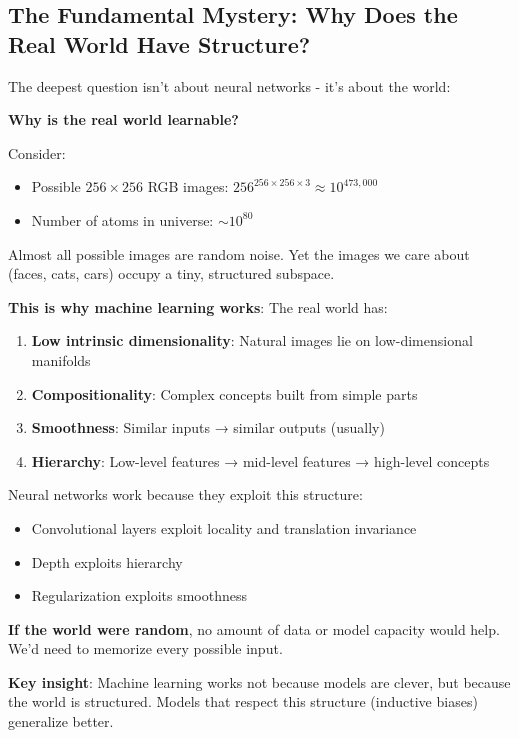 \subsection{The Fundamental Mystery: Why Does the Real World Have Structure?}

The deepest question isn't about neural networks - it's about the world:

\textbf{Why is the real world learnable?}

Consider:
\begin{itemize}
\item Possible $256 \times 256$ RGB images: $256^{256 \times 256 \times 3} \approx 10^{473{,}000}$
\item Number of atoms in universe: $\sim 10^{80}$
\end{itemize}

Almost all possible images are random noise. Yet the images we care about (faces, cats, cars) occupy a tiny, structured subspace.

\textbf{This is why machine learning works}: The real world has:
\begin{enumerate}
\item \textbf{Low intrinsic dimensionality}: Natural images lie on low-dimensional manifolds
\item \textbf{Compositionality}: Complex concepts built from simple parts
\item \textbf{Smoothness}: Similar inputs → similar outputs (usually)
\item \textbf{Hierarchy}: Low-level features → mid-level features → high-level concepts
\end{enumerate}

Neural networks work because they exploit this structure:
\begin{itemize}
\item Convolutional layers exploit locality and translation invariance
\item Depth exploits hierarchy
\item Regularization exploits smoothness
\end{itemize}

\textbf{If the world were random}, no amount of data or model capacity would help. We'd need to memorize every possible input.

\textbf{Key insight}: Machine learning works not because models are clever, but because the world is structured. Models that respect this structure (inductive biases) generalize better.

